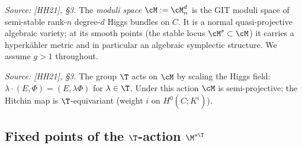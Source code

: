 \begin{definition}
  \label{def:moduli_Higgs}
  \textit{Source: [HH21], §3.}
  The \emph{moduli space} \(\cM := \cM^d_n\) is the GIT moduli space of semi-stable rank-\(n\)
  degree-\(d\) Higgs bundles on \(C\).  It is a normal quasi-projective algebraic variety; at its
  smooth points (the stable locus \(\cM^s \subset \cM\)) it carries a hyperkähler metric and in
  particular an algebraic symplectic structure.  We assume \(g > 1\) throughout.
\end{definition}

\begin{definition}
  \label{def:T_action_moduli}
  \textit{Source: [HH21], §3.}
  The group \(\T\) acts on \(\cM\) by scaling the Higgs field:
  \(\lambda \cdot (E, \Phi) = (E, \lambda\Phi)\) for \(\lambda \in \T\).
  Under this action \(\cM\) is semi-projective; the Hitchin map is \(\T\)-equivariant
  (weight \(i\) on \(H^0(C; K^i)\)).
\end{definition}

\subsection{Fixed points of the \(\T\)-action \(\M^{s\T}\)}

